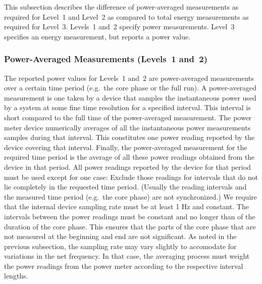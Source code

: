 This subsection describes the difference of power-averaged measurements as required for Level~1 and Level~2 as compared to total energy measurements as required for Level~3.
Levels~1 and~2 specify power measurements.
Level~3 specifies an energy measurement, but reports a power value.

\subsubsection{Power-Averaged Measurements (Levels~1 and~2)}

The reported power values for Levels~1 and~2 are power-averaged measurements over a certain time period (e.g.~the core phase or the full run).
A power-averaged measurement is one taken by a device that samples the instantaneous power used by a system at some fine time resolution for a specified interval.
This interval is short compared to the full time of the power-averaged measurement.
The power meter device numerically averages of all the instantaneous power measurements samples during that interval.
This constitutes one power reading reported by the device covering that interval.
Finally, the power-averaged measurement for the required time period is the average of all these power readings obtained from the device in that period.
All power readings reported by the device for that period must be used except for one case:
Exclude those readings for intervals that do not lie completely in the requested time period.
(Usually the reading intervals and the measured time period (e.g.~the core phase) are not synchronized.)
We require that the internal device sampling rate must be at least 1 Hz and constant.
The intervals between the power readings must be constant and no longer than \MaxReadingIntervalCorePhaseLTwoThree{} of the duration of the core phase.
This ensures that the parts of the core phase that are not measured at the beginning and end are not significant.
As noted in the previous subsection, the sampling rate may vary slightly to accomodate for variations in the net frequency.
In that case, the averaging process must weight the power readings from the power meter according to the respective interval lengths.

